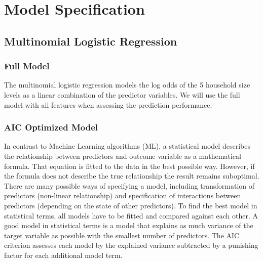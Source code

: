 \documentclass[]{article}
\newenvironment{Shaded}{\begin{snugshade}}{\end{snugshade}}
\newcommand{\DataTypeTok}[1]{\textcolor[rgb]{0.13,0.29,0.53}{#1}}
\newcommand{\DecValTok}[1]{\textcolor[rgb]{0.00,0.00,0.81}{#1}}
\newcommand{\KeywordTok}[1]{\textcolor[rgb]{0.13,0.29,0.53}{\textbf{#1}}}
\newcommand{\NormalTok}[1]{#1}
\newcommand{\OperatorTok}[1]{\textcolor[rgb]{0.81,0.36,0.00}{\textbf{#1}}}
\newcommand{\OtherTok}[1]{\textcolor[rgb]{0.56,0.35,0.01}{#1}}
\newcommand{\StringTok}[1]{\textcolor[rgb]{0.31,0.60,0.02}{#1}}
\begin{document}
\hypertarget{model-specification}{%
\section{Model Specification}\label{model-specification}}

\hypertarget{multinomial-logistic-regression}{%
\subsection{Multinomial Logistic
Regression}\label{multinomial-logistic-regression}}

\hypertarget{full-model}{%
\subsubsection{Full Model}\label{full-model}}

The multinomial logistic regression models the log odds of the 5
household size levels as a linear combination of the predictor
variables. We will use the full model with all features when assessing
the prediction performance.

\begin{Shaded}
\end{Shaded}

\hypertarget{aic-optimized-model}{%
\subsubsection{AIC Optimized Model}\label{aic-optimized-model}}

In contrast to Machine Learning algorithms (ML), a statistical model
describes the relationship between predictors and outcome variable as a
mathematical formula. That equation is fitted to the data in the best
possible way. However, if the formula does not describe the true
relationship the result remains suboptimal. There are many possible ways
of specifying a model, including transformation of predictors
(non-linear relationship) and specification of interactions between
predictors (depending on the state of other predictors). To find the
best model in statistical terms, all models have to be fitted and
compared against each other. A good model in statistical terms is a
model that explains as much variance of the target variable as possible
with the smallest number of predictors. The AIC criterion assesses each
model by the explained variance subtracted by a punishing factor for
each additional model term.
\end{document}
